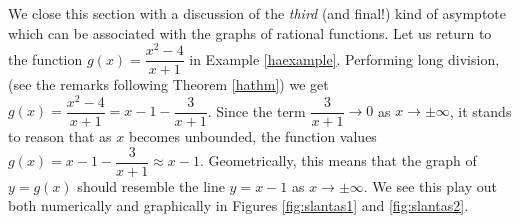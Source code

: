 \pagebreak





We close this section with a discussion of the \textit{third} (and final!) kind of asymptote which can be associated with the graphs of rational functions. Let us return to the function $g(x) = \dfrac{x^2-4}{x+1}$ in Example \ref{haexample}. Performing long division, (see the remarks following Theorem \ref{hathm}) we get $g(x) = \dfrac{x^2-4}{x+1} = x-1 - \dfrac{3}{x+1}$.  Since the term $\dfrac{3}{x+1} \rightarrow 0$ as $x \rightarrow \pm \infty$, it stands to reason that as $x$ becomes unbounded, the function values   $g(x) = x-1 - \dfrac{3}{x+1} \approx x-1$.  Geometrically, this means that the graph of $y=g(x)$ should resemble the line $y = x-1$ as $x \rightarrow \pm \infty$.  We see this play out both numerically and graphically in Figures \ref{fig:slantas1} and \ref{fig:slantas2}.

  

